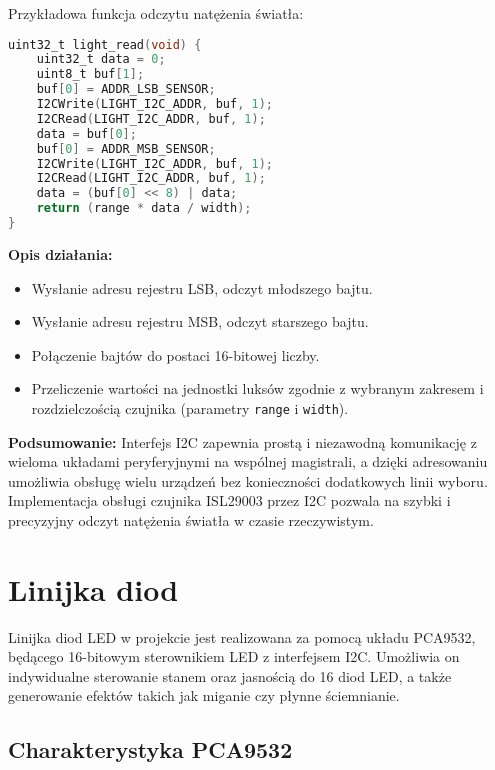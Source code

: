 \documentclass[a4paper,12pt]{report}
\begin{document}
Przykładowa funkcja odczytu natężenia światła:
\begin{lstlisting}[language=C]
uint32_t light_read(void) {
    uint32_t data = 0;
    uint8_t buf[1];
    buf[0] = ADDR_LSB_SENSOR;
    I2CWrite(LIGHT_I2C_ADDR, buf, 1);
    I2CRead(LIGHT_I2C_ADDR, buf, 1);
    data = buf[0];
    buf[0] = ADDR_MSB_SENSOR;
    I2CWrite(LIGHT_I2C_ADDR, buf, 1);
    I2CRead(LIGHT_I2C_ADDR, buf, 1);
    data = (buf[0] << 8) | data;
    return (range * data / width);
}
\end{lstlisting}

\textbf{Opis działania:}
\begin{itemize}
    \item Wysłanie adresu rejestru LSB, odczyt młodszego bajtu.
    \item Wysłanie adresu rejestru MSB, odczyt starszego bajtu.
    \item Połączenie bajtów do postaci 16-bitowej liczby.
    \item Przeliczenie wartości na jednostki luksów zgodnie z wybranym zakresem i rozdzielczością czujnika (parametry \texttt{range} i \texttt{width}).
\end{itemize}

\textbf{Podsumowanie:}  
Interfejs I2C zapewnia prostą i niezawodną komunikację z wieloma układami peryferyjnymi na wspólnej magistrali, a dzięki adresowaniu umożliwia obsługę wielu urządzeń bez konieczności dodatkowych linii wyboru. Implementacja obsługi czujnika ISL29003 przez I2C pozwala na szybki i precyzyjny odczyt natężenia światła w czasie rzeczywistym.

\section{Linijka diod}

Linijka diod LED w projekcie jest realizowana za pomocą układu PCA9532, będącego 16-bitowym sterownikiem LED z interfejsem I2C. Umożliwia on indywidualne sterowanie stanem oraz jasnością do 16 diod LED, a także generowanie efektów takich jak miganie czy płynne ściemnianie.

\subsection{Charakterystyka PCA9532}
\end{document}
